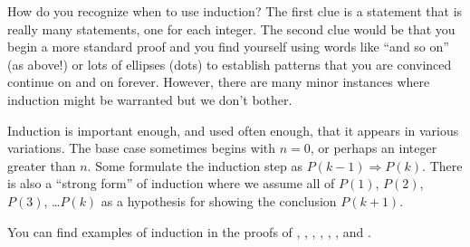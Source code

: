 %
\begin{para}How do you recognize when to use induction?  The first clue is a statement that is really many statements, one for each integer.  The second clue would be that you begin a more standard proof and you find yourself using words like ``and so on'' (as above!) or lots of ellipses (dots) to establish patterns that you are convinced continue on and on forever.  However, there are many minor instances where induction might be warranted but we don't bother.\end{para}
%
\begin{para}Induction is important enough, and used often enough, that it appears in various variations.  The base case sometimes begins with $n=0$, or perhaps an integer greater than $n$.  Some formulate the induction step as $P(k-1)\Rightarrow P(k)$.  There is also a ``strong form'' of induction where we assume all of $P(1)$, $P(2)$, $P(3)$, \dots $P(k)$ as a hypothesis for showing the conclusion $P(k+1)$.\end{para}
%
%
\begin{para}You can find examples of induction in the proofs of 
,  
,     
,       
,      
,   
,      
and
.\end{para}      